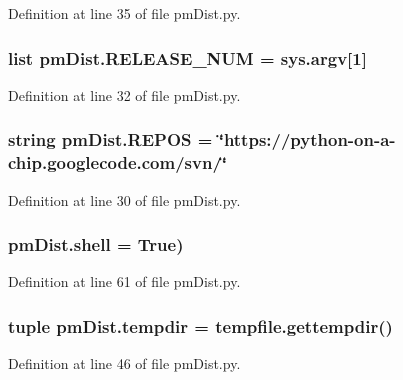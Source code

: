 Definition at line 35 of file pm\-Dist.\-py.

\hypertarget{namespacepm_dist_aa5371bd34791a27a514bb0cce333d5c0}{
\subsubsection[{R\-E\-L\-E\-A\-S\-E\-\_\-\-N\-U\-M}]{\setlength{\rightskip}{0pt plus 5cm}list pm\-Dist.\-R\-E\-L\-E\-A\-S\-E\-\_\-\-N\-U\-M = sys.\-argv\mbox{[}1\mbox{]}}}\label{namespacepm_dist_aa5371bd34791a27a514bb0cce333d5c0}


Definition at line 32 of file pm\-Dist.\-py.

\hypertarget{namespacepm_dist_ad99dbda76477db06e3ed433e84315280}{
\subsubsection[{R\-E\-P\-O\-S}]{\setlength{\rightskip}{0pt plus 5cm}string pm\-Dist.\-R\-E\-P\-O\-S = \char`\"{}https\-://python-\/on-\/a-\/chip.\-googlecode.\-com/svn/\char`\"{}}}\label{namespacepm_dist_ad99dbda76477db06e3ed433e84315280}


Definition at line 30 of file pm\-Dist.\-py.

\hypertarget{namespacepm_dist_abf2580adf6ba60a74862e3f4f093a05e}{
\subsubsection[{shell}]{\setlength{\rightskip}{0pt plus 5cm}pm\-Dist.\-shell = True)}}\label{namespacepm_dist_abf2580adf6ba60a74862e3f4f093a05e}


Definition at line 61 of file pm\-Dist.\-py.

\hypertarget{namespacepm_dist_aefe127821e8caea0634b43a66eca04e6}{
\subsubsection[{tempdir}]{\setlength{\rightskip}{0pt plus 5cm}tuple pm\-Dist.\-tempdir = tempfile.\-gettempdir()}}\label{namespacepm_dist_aefe127821e8caea0634b43a66eca04e6}


Definition at line 46 of file pm\-Dist.\-py.

